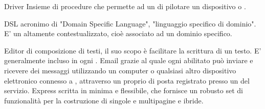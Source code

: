 \elemento
{Driver}
{Insieme di procedure che permette ad un  di pilotare un dispositivo  o .}

\elemento
{DSL} 
{acronimo di "Domain Specific Language", "linguaggio specifico di dominio". E' un  altamente contestualizzato, cioè associato ad un dominio specifico.} 


\elemento
{Editor}
{ di composizione di testi, il suo scopo è facilitare la scrittura di un testo. E' generalmente incluso in ogni .}
\elemento
{Email} 
{ grazie al quale ogni  abilitato può inviare e ricevere dei messaggi utilizzando un computer o qualsiasi altro dispositivo elettronico connesso a , attraverso un proprio  di posta registrato presso un  del {servizio}.}
\elemento
{Express} 
{ scritta in  minima e flessibile, che fornisce un robusto set di funzionalità per la costruzione di singole e multipagine e  ibride.}

